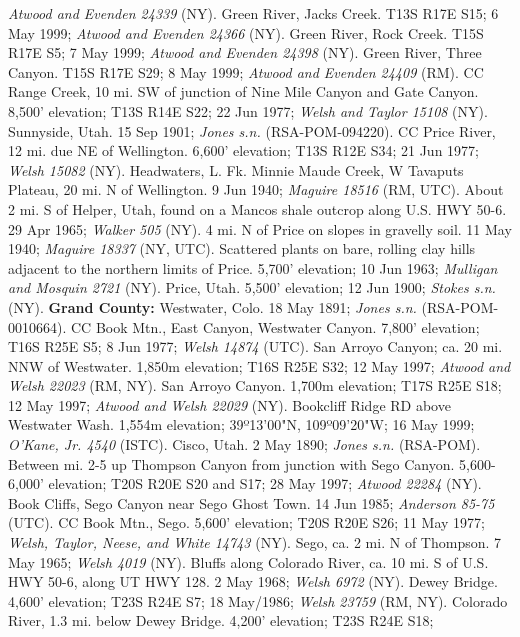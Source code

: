 \textit{Atwood and Evenden 24339} (NY).
Green River, Jacks Creek. T13S R17E S15; 6 May 1999;
\textit{Atwood and Evenden 24366} (NY).
Green River, Rock Creek. T15S R17E S5; 7 May 1999;
\textit{Atwood and Evenden 24398} (NY).
Green River, Three Canyon. T15S R17E S29; 8 May 1999;
\textit{Atwood and Evenden 24409} (RM).
CC Range Creek, 10 mi. SW of junction of Nine Mile Canyon and Gate Canyon.
8,500' elevation; T13S R14E S22; 22 Jun 1977;
\textit{Welsh and Taylor 15108} (NY).
Sunnyside, Utah. 15 Sep 1901; \textit{Jones s.n.} (RSA-POM-094220).
CC Price River, 12 mi. due NE of Wellington. 6,600' elevation;  T13S R12E S34;
21 Jun 1977; \textit{Welsh 15082} (NY).
Headwaters, L. Fk. Minnie Maude Creek, W Tavaputs Plateau, 20 mi. N of
Wellington. 9 Jun 1940; \textit{Maguire 18516} (RM, UTC).
About 2 mi. S of Helper, Utah, found on a Mancos shale outcrop along U.S. HWY
50-6. 29 Apr 1965; \textit{Walker 505} (NY).
4 mi. N of Price on slopes in gravelly soil. 11 May 1940;
\textit{Maguire 18337} (NY, UTC).
Scattered plants on bare, rolling clay hills adjacent to the northern limits of
Price. 5,700' elevation; 10 Jun 1963; \textit{Mulligan and Mosquin 2721} (NY).
Price, Utah. 5,500' elevation; 12 Jun 1900; \textit{Stokes s.n.} (NY).
  \textbf{Grand County:}
Westwater, Colo. 18 May 1891; \textit{Jones s.n.} (RSA-POM-0010664).
CC Book Mtn., East Canyon, Westwater Canyon. 7,800' elevation; T16S R25E S5;
8 Jun 1977; \textit{Welsh 14874} (UTC).
San Arroyo Canyon; ca. 20 mi. NNW of Westwater. 1,850m elevation; T16S R25E S32;
12 May 1997; \textit{Atwood and Welsh 22023} (RM, NY).
San Arroyo Canyon. 1,700m elevation; T17S R25E S18; 12 May 1997;
\textit{Atwood and Welsh 22029} (NY).
Bookcliff Ridge RD above Westwater Wash. 1,554m elevation;
39º13'00"N, 109º09'20"W; 16 May 1999; \textit{O'Kane, Jr. 4540} (ISTC).
Cisco, Utah. 2 May 1890; \textit{Jones s.n.} (RSA-POM).
Between mi. 2-5 up Thompson Canyon from junction with Sego Canyon.
5,600-6,000' elevation; T20S R20E S20 and S17; 28 May 1997;
\textit{Atwood 22284} (NY).
Book Cliffs, Sego Canyon near Sego Ghost Town. 14 Jun 1985;
\textit{Anderson 85-75} (UTC).
CC Book Mtn., Sego. 5,600' elevation; T20S R20E S26; 11 May 1977;
\textit{Welsh, Taylor, Neese, and White 14743} (NY).
Sego, ca. 2 mi. N of Thompson. 7 May 1965; \textit{Welsh 4019} (NY).
Bluffs along Colorado River, ca. 10 mi. S of U.S. HWY 50-6, along UT HWY 128.
2 May 1968; \textit{Welsh 6972} (NY).
Dewey Bridge. 4,600' elevation; T23S R24E S7; 18 May/1986;
\textit{Welsh 23759} (RM, NY).
Colorado River, 1.3 mi. below Dewey Bridge. 4,200' elevation; T23S R24E S18;
